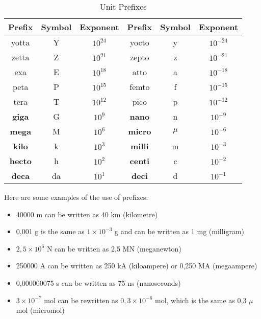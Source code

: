 \begin{table}[htbp]
\centering
\begin{tabular}{|c|c|c||c|c|c|}\hline
\textbf{Prefix}& \textbf{Symbol}& \textbf{Exponent}& \textbf{Prefix}& \textbf{Symbol}& \textbf{Exponent} \\\hline
yotta & Y& $10^{24}$ & yocto& y & $10^{- 24}$ \\\hline
zetta & Z & $10^{21}$ & zepto & z & $10^{- 21}$ \\\hline
exa & E & $10^{18}$ & atto & a & $10^{- 18}$ \\\hline
peta & P & $10^{15}$ & femto & f & $10^{- 15}$ \\\hline
tera & T & $10^{12}$ & pico & p & $10^{- 12}$ \\ \hline
{\bf giga} & G & $10^9$ & {\bf nano} & n & $10^{- 9}$ \\ \hline
{\bf mega} & M & $10^6$ & {\bf micro} & $\mu$ & $10^{- 6}$ \\\hline
{\bf kilo} & k & $10^3$ & {\bf milli} & m & $10^{- 3}$ \\\hline
{\bf hecto} & h& $10^2$ & {\bf centi} & c & $10^{- 2}$ \\\hline
{\bf deca} & da & $10^1$ & {\bf deci} & d & $10^{- 1}$ \\ \hline
\end{tabular}
\caption{Unit Prefixes}\label{tab:dim:prefixes}
\end{table}


Here are some examples of the use of prefixes:
\begin{itemize}
\item {40000 m can be written as 40 km (kilometre)}
\item {0,001 g is the same as $1\times10^{-3}$ g and can be written as 1 mg (milligram)}
\item {$2,5\times10^{6}$ N can be written as 2,5 MN (meganewton)}
\item {250000 A can be written as 250 kA (kiloampere) or 0,250 MA (megaampere)}
\item {0,000000075 s can be written as 75 ns (nanoseconds)}
\item {$3\times10^{-7}$ mol can be rewritten as $0,3\times10^{-6}$ mol, which is the same as 0,3 $\mu$mol (micromol)}
\end{itemize}

